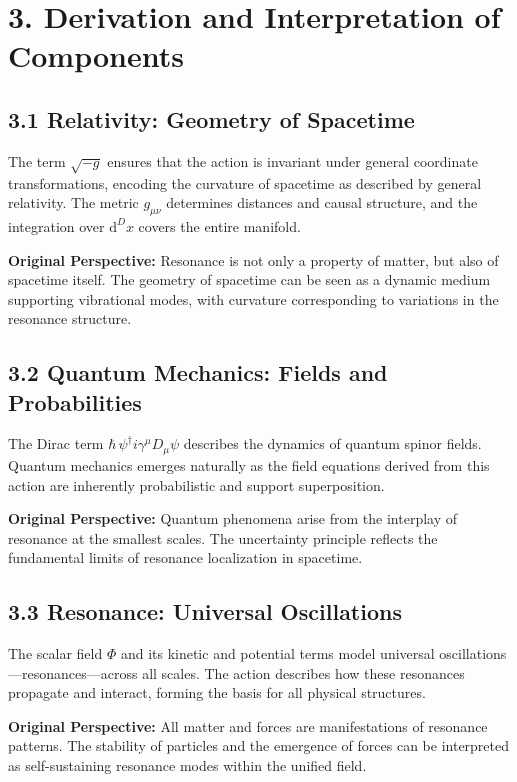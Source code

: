 \documentclass[12pt]{article}
\begin{document}
\section*{\small 3. Derivation and Interpretation of Components}

\subsection*{3.1 Relativity: Geometry of Spacetime}
The term $\sqrt{-g}$ ensures that the action is invariant under general coordinate transformations, encoding the curvature of spacetime as described by general relativity. The metric $g_{\mu\nu}$ determines distances and causal structure, and the integration over $\mathrm{d}^D x$ covers the entire manifold.

\textbf{Original Perspective:}  
Resonance is not only a property of matter, but also of spacetime itself. The geometry of spacetime can be seen as a dynamic medium supporting vibrational modes, with curvature corresponding to variations in the resonance structure.

\subsection*{3.2 Quantum Mechanics: Fields and Probabilities}
The Dirac term $\hbar\, \psi^\dagger i \gamma^\mu D_\mu \psi$ describes the dynamics of quantum spinor fields. Quantum mechanics emerges naturally as the field equations derived from this action are inherently probabilistic and support superposition.

\textbf{Original Perspective:}  
Quantum phenomena arise from the interplay of resonance at the smallest scales. The uncertainty principle reflects the fundamental limits of resonance localization in spacetime.

\subsection*{3.3 Resonance: Universal Oscillations}
The scalar field $\Phi$ and its kinetic and potential terms model universal oscillations—resonances—across all scales. The action describes how these resonances propagate and interact, forming the basis for all physical structures.

\textbf{Original Perspective:}  
All matter and forces are manifestations of resonance patterns. The stability of particles and the emergence of forces can be interpreted as self-sustaining resonance modes within the unified field.
\end{document}
